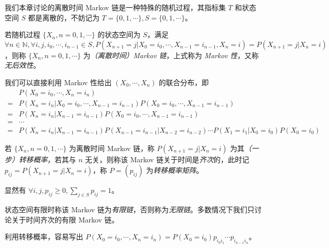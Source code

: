 \documentclass[../main.tex]{subfiles}
\begin{document}
我们本章讨论的离散时间 Markov 链是一种特殊的随机过程，其指标集 $T$ 和状态空间 $S$ 都是离散的，不妨记为 $T=\{0,1,\cdots\},S=\{0,1,\cdots\}$。

\begin{definition}\label{def:7.1.1}
    若随机过程 $\{X_n,n=0,1,\cdots\}$ 的状态空间为 $S$，满足 $\forall n\in\mathbb N,\forall i,j,i_0,\cdots,i_{n-1}\in S,P(X_{n+1}=j|X_0=i_0,\cdots,X_{n-1}=i_{n-1},X_n=i)=P(X_{n+1}=j|X_n=i)$，则称 $\{X_n,n=0,1,\cdots\}$ 为\emph{（离散时间）Markov 链}，上式称为 \emph{Markov 性}，又称\emph{无后效性}。
\end{definition}

我们可以直接利用 Markov 性给出 $(X_0,\cdots,X_n)$ 的联合分布，即
\begin{equation*}
    \begin{aligned}
          & P(X_0=i_0,\cdots,X_n=i_n)                                                                       \\
        = & P(X_n=i_n|X_0=i_0,\cdots,X_{n-1}=i_{n-1})P(X_0=i_0,\cdots,X_{n-1}=i_{n-1})                      \\
        = & P(X_n=i_n|X_{n-1}=i_{n-1})P(X_0=i_0,\cdots,X_{n-1}=i_{n-1})                                     \\
        = & \cdots                                                                                          \\
        = & P(X_n=i_n|X_{n-1}=i_{n-1})P(X_{n-1}=i_{n-1}|X_{n-2}=i_{n-2})\cdots P(X_1=i_1|X_0=i_0)P(X_0=i_0)
    \end{aligned}
\end{equation*}

\begin{definition}\label{def:7.1.2}
    若 $\{X_n,n=0,1,\cdots\}$ 为离散时间 Markov 链，称 $P(X_{n+1}=j|X_n=i)$ 为其\emph{（一步）转移概率}，若其与 $n$ 无关，则称该 Markov 链关于时间是\emph{齐次}的，此时记 $p_{ij}=P(X_{n+1}=j|X_n=i)$，称 $P=(p_{ij})$ 为\emph{转移概率矩阵}。
\end{definition}

显然有 $\forall i,j,p_{ij}\geq0,\sum_{j\in S}p_{ij}=1$。

状态空间有限时称该 Markov 链为\emph{有限链}，否则称为\emph{无限链}。多数情况下我们只讨论关于时间齐次的有限 Markov 链。

利用转移概率，容易写出 $P(X_0=i_0,\cdots,X_n=i_n)=P(X_0=i_0)p_{i_0i_1}\cdots p_{i_{n-1}i_n}$。
\end{document}
